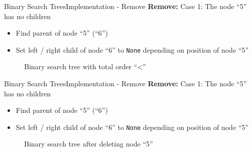 
\begin{frame}{Binary Search Trees}{Implementation - Remove}
  \textbf{Remove:} Case 1: The node \enquote{5} has no children\\
  \begin{itemize}
    \item<2->
      Find {\color{Mittel-Blau}parent} of node \enquote{5} (\enquote{6})
    \item<3->
      Set left / right child of node \enquote{6} to
      \texttt{\color{Mittel-Blau}None} depending on position of node \enquote{5}
  \end{itemize}
  \begin{figure}
    
    \caption{Binary search tree with total order
      \enquote{\color{Mittel-Blau}<}}
    \label{fig:binary_search_trees:binary_tree_remove_no_child}
  \end{figure}
\end{frame}


\begin{frame}{Binary Search Trees}{Implementation - Remove}
  \textbf{Remove:} Case 1: The node \enquote{5} has no children\\
  \begin{itemize}
    \item
      Find {\color{Mittel-Blau}parent} of node \enquote{5} (\enquote{6})
    \item
      Set left / right child of node \enquote{6} to
      \texttt{\color{Mittel-Blau}None} depending on position of node \enquote{5}
  \end{itemize}
  \begin{figure}
    
    \caption{Binary search tree after deleting node \enquote{5}}
    \label{fig:binary_search_trees:binary_tree_remove_no_child_result}
  \end{figure}
\end{frame}


